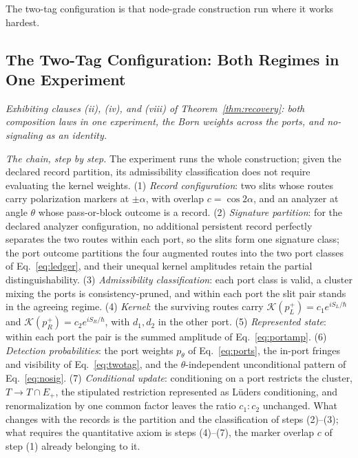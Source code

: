 The two-tag configuration is that node-grade construction run where it works hardest.

\subsection{The Two-Tag Configuration: Both Regimes in One Experiment}\label{sec:twotag}

\noindent\emph{Exhibiting clauses (ii), (iv), and (viii) of Theorem~\ref{thm:recovery}: both composition laws in one experiment, the Born weights across the ports, and no-signaling as an identity.}

\noindent\textit{The chain, step by step.} The experiment runs the whole construction; given the declared record partition, its admissibility classification does not require evaluating the kernel weights. (1) \emph{Record configuration}: two slits whose routes carry polarization markers at $\pm\alpha$, with overlap $c = \cos 2\alpha$, and an analyzer at angle $\theta$ whose pass-or-block outcome is a record. (2) \emph{Signature partition}: for the declared analyzer configuration, no additional persistent record perfectly separates the two routes within each port, so the slits form one signature class; the port outcome partitions the four augmented routes into the two port classes of Eq.~\eqref{eq:ledger}, and their unequal kernel amplitudes retain the partial distinguishability. (3) \emph{Admissibility classification}: each port class is valid, a cluster mixing the ports is consistency-pruned, and within each port the slit pair stands in the agreeing regime. (4) \emph{Kernel}: the surviving routes carry $\mathcal{K}(p_L^{+}) = c_1 e^{iS_L/\hbar}$ and $\mathcal{K}(p_R^{+}) = c_2 e^{iS_R/\hbar}$, with $d_1, d_2$ in the other port. (5) \emph{Represented state}: within each port the pair is the summed amplitude of Eq.~\eqref{eq:portamp}. (6) \emph{Detection probabilities}: the port weights $p_\theta$ of Eq.~\eqref{eq:ports}, the in-port fringes and visibility of Eq.~\eqref{eq:twotag}, and the $\theta$-independent unconditional pattern of Eq.~\eqref{eq:nosig}. (7) \emph{Conditional update}: conditioning on a port restricts the cluster, $T \to T \cap E_{+}$, the stipulated restriction represented as L\"uders conditioning, and renormalization by one common factor leaves the ratio $c_1 : c_2$ unchanged. What changes with the records is the partition and the classification of steps (2)--(3); what requires the quantitative axiom is steps (4)--(7), the marker overlap $c$ of step (1) already belonging to it.



